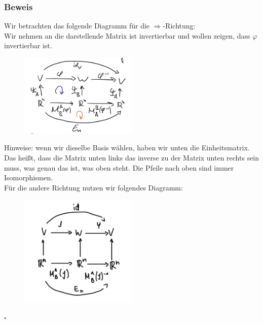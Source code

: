 \documentclass{article}
\begin{document}
\subsubsection*{Beweis}
Wir betrachten das folgende Diagramm für die $\Rightarrow$-Richtung: \\
Wir nehmen an die darstellende Matrix ist invertierbar und wollen zeigen, dass $\varphi$ invertierbar ist. \\
\begin{center}
    \begin{figure}[h]
        \centering
        \includegraphics[width=0.5\textwidth]{Images/4.64.png}
    \end{figure}
\end{center}
Hinweise: wenn wir dieselbe Basis wählen, haben wir unten die Einheitsmatrix. Das heißt, dass die Matrix unten links das inverse zu der Matrix unten rechts sein muss, was genau das ist, was oben steht. 
Die Pfeile nach oben sind immer Isomorphismen. \\
Für die andere Richtung nutzen wir folgendes Diagramm: \\
\begin{center}
    \begin{figure}[h]
        \centering
        \includegraphics[width=0.5\textwidth]{Images/4.64.2.png}
    \end{figure}
\end{center}
$\square$ \\
\\
\end{document}
